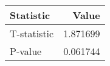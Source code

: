 \begin{tabular}{lr}
\toprule
Statistic & Value \\
\midrule
T-statistic & 1.871699 \\
P-value & 0.061744 \\
\bottomrule
\end{tabular}
